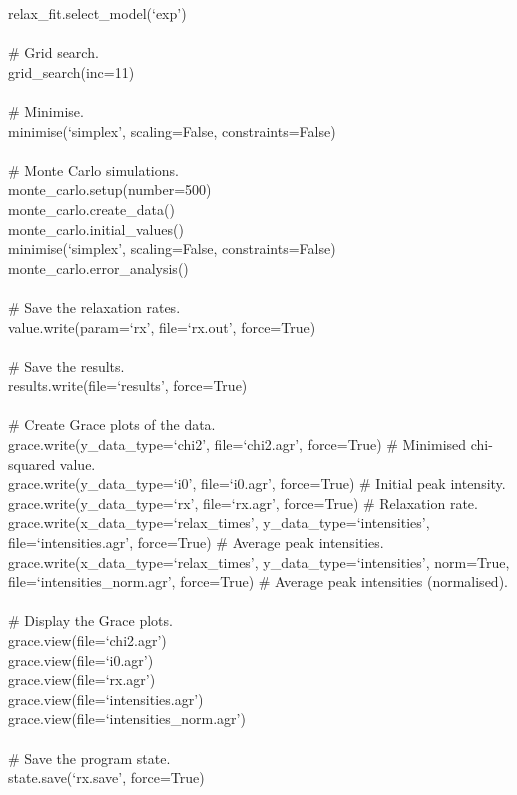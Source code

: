 \begin{exampleenv}
relax\_fit.select\_model(`exp') \\
 \\
\# Grid search. \\
grid\_search(inc=11) \\
 \\
\# Minimise. \\
minimise(`simplex', scaling=False, constraints=False) \\
 \\
\# Monte Carlo simulations. \\
monte\_carlo.setup(number=500) \\
monte\_carlo.create\_data() \\
monte\_carlo.initial\_values() \\
minimise(`simplex', scaling=False, constraints=False) \\
monte\_carlo.error\_analysis() \\
 \\
\# Save the relaxation rates. \\
value.write(param=`rx', file=`rx.out', force=True) \\
 \\
\# Save the results. \\
results.write(file=`results', force=True) \\
 \\
\# Create Grace plots of the data. \\
grace.write(y\_data\_type=`chi2', file=`chi2.agr', force=True)    \# Minimised chi-squared value. \\
grace.write(y\_data\_type=`i0', file=`i0.agr', force=True)    \# Initial peak intensity. \\
grace.write(y\_data\_type=`rx', file=`rx.agr', force=True)    \# Relaxation rate. \\
grace.write(x\_data\_type=`relax\_times', y\_data\_type=`intensities', file=`intensities.agr', force=True)    \# Average peak intensities. \\
grace.write(x\_data\_type=`relax\_times', y\_data\_type=`intensities', norm=True, file=`intensities\_norm.agr', force=True)    \# Average peak intensities (normalised). \\
 \\
\# Display the Grace plots. \\
grace.view(file=`chi2.agr') \\
grace.view(file=`i0.agr') \\
grace.view(file=`rx.agr') \\
grace.view(file=`intensities.agr') \\
grace.view(file=`intensities\_norm.agr') \\
 \\
\# Save the program state. \\
state.save(`rx.save', force=True)
\end{exampleenv}



